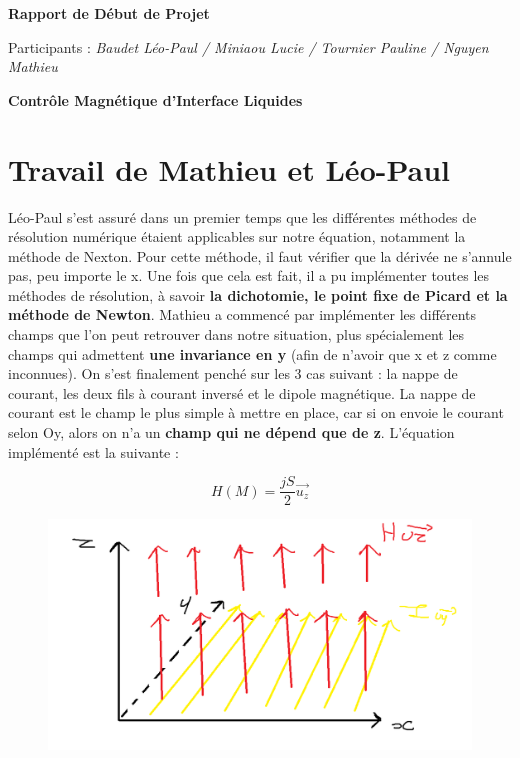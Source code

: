 \documentclass{article}
\begin{document}
\begin{center}
{\huge \textbf{Rapport de Début de Projet}}
\end{center}

\begin{center}
Participants : \textit{Baudet Léo-Paul / Miniaou Lucie / Tournier Pauline / Nguyen Mathieu\\}

\end{center}
\vspace{0.05\textheight}
\begin{center}
{\LARGE \textbf{Contrôle Magnétique d'Interface Liquides}}
\end{center}

\section{Travail de Mathieu et Léo-Paul}
Léo-Paul s'est assuré dans un premier temps que les différentes méthodes de résolution numérique étaient applicables sur notre équation, notamment la méthode de Nexton. Pour cette méthode, il faut vérifier que la dérivée ne s'annule pas, peu importe le x. Une fois que cela est fait, il a pu implémenter toutes les méthodes de résolution, à savoir \textbf{la dichotomie, le point fixe de Picard et la méthode de Newton}.
\newline
Mathieu a commencé par implémenter les différents champs que l'on peut retrouver dans notre situation, plus spécialement les champs qui admettent \textbf{une invariance en y} (afin de n'avoir que x et z comme inconnues). On s'est finalement penché sur les 3 cas suivant : la nappe de courant, les deux fils à courant inversé et le dipole magnétique.
\newline
La nappe de courant est le champ le plus simple à mettre en place, car si on envoie le courant selon Oy, alors on n'a un \textbf{champ qui ne dépend que de z}. L'équation implémenté est la suivante : 

\begin{equation}
H(M) = \frac{jS}{2}\vec{u_{z}}
\label{eq08}
\end{equation}
\begin{figure}[h]
	\centering
    \includegraphics[width=.5\linewidth]{Nappe.png}
    
\end{figure}
\end{document}
